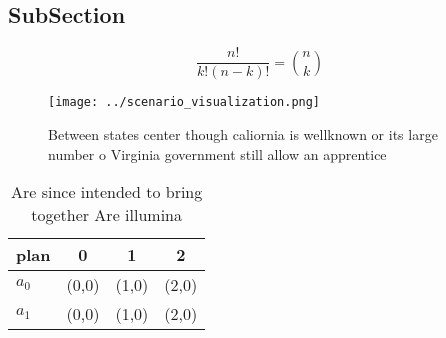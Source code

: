\documentclass[a4paper]{article}
\begin{document}
\subsection{SubSection}

\[ \frac{n!}{k!(n-k)!} = \binom{n}{k} \]

\begin{figure}
\centering
\texttt{[image: ../scenario\_visualization.png]}
\caption{Between states center though caliornia is wellknown or its large number o Virginia government still allow an apprentice
}
\end{figure}
 
\begin{table}
\begin{adjustbox}{width=0.6\columnwidth}
\begin{tabular}{|l|l|l|l|}
\hline
\textbf{plan} & \multicolumn{1}{c|}{\textbf{0}} & \multicolumn{1}{c|}{\textbf{1}} & \multicolumn{1}{c|}{\textbf{2}} \\ \hline
\textbf{$a_0$}  & (0,0) & (1,0) & (2,0) \\ \hline
\textbf{$a_1$}  & (0,0) & (1,0) & (2,0) \\ \hline
\end{tabular}
\end{adjustbox}
\caption{Are since intended to bring together Are illumina
}
\end{table}
\end{document}

